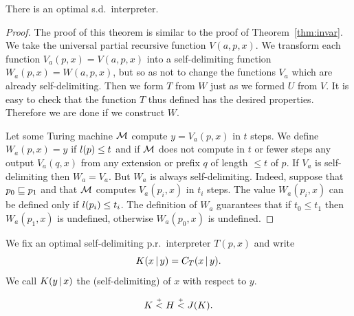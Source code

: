 \begin{theorem}
  \leanok
   \label{thm:sdopt} There is an optimal s.d.~interpreter.
\end{theorem}

\begin{proof}
  \leanok
The proof of this theorem is similar to the proof of Theorem~\ref{thm:invar}.
We take the universal partial recursive function \( V(a,p,x) \). 
We transform each function 
\( V_a(p,x)=V(a,p,x) \) into a self-delimiting function
\( W_a(p,x)=W(a,p,x) \), but so as not to change the functions \( V_a \)
which are already self-delimiting. 
Then we form \( T \) from \( W \) just as we formed \( U \) from \( V \). 
It is easy to check that the function \( T \)
thus defined has the desired properties. 
Therefore we are done if we construct \( W \).

Let some Turing machine \( \mathcal{M} \) compute \( y=V_a(p,x) \) in \( t \) steps.
We define \( W_a(p,x)=y \) if \( l(p) \le t \) and if \( \mathcal{M} \) does not
compute in \( t \) or fewer steps any output \( V_a(q,x) \) from any
extension or prefix \( q \) of length \( \le t \) of \( p \). 
If \( V_a \) is
self-delimiting then \( W_a=V_a \). But \( W_a \) is always self-delimiting.
Indeed, suppose that \( p_{0} \sqsubseteq p_{1} \) and that \( \mathcal{M} \) computes
\( V_a(p_{i},x) \) in \( t_{i} \) steps. 
The value \( W_a(p_{i},x) \) can be defined only if \( l(p_{i}) \le t_{i} \). 
The definition of \( W_a \) guarantees that if
\( t_{0} \le t_{1} \) then \( W_a(p_{1},x) \) is undefined, otherwise \( W_a(p_{0},x) \)
is undefined. 
 \end{proof}

 \begin{definition}
  \label{def:K}
  \leanok
We fix an optimal self-delimiting p.r.~interpreter \( T(p,x) \) and write
 \[ 	
K(x \,\vert\, y) = C_{T}(x \,\vert\, y).
 \]
We call \( K(y \,\vert\, x) \) the (self-delimiting)  
of \( x \) with respect to \( y \). 
 \end{definition}

\begin{theorem}
  \leanok
   \label{thm:HK} 
 \setcounter{equation}{2}%
 \begin{equation} K \stackrel{{}_+}{<} H \stackrel{{}_+}{<} J(K). 
 \end{equation}
 \end{theorem}

